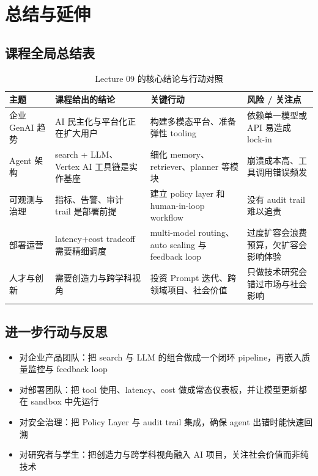 \documentclass[a4paper]{article}
\begin{document}
\section{总结与延伸}

\subsection{课程全局总结表}

\begin{table}[H]
\centering
\begin{tabular}{p{} p{} p{} p{}}
\toprule
主题 & 课程给出的结论 & 关键行动 & 风险 / 关注点 \\
\midrule
企业 GenAI 趋势 & AI 民主化与平台化正在扩大用户 & 构建多模态平台、准备弹性 tooling & 依赖单一模型或 API 易造成 lock-in \\
Agent 架构 & search + LLM、Vertex AI 工具链是实作基座 & 细化 memory、retriever、planner 等模块 & 崩溃成本高、工具调用错误频发 \\
可观测与治理 & 指标、告警、审计 trail 是部署前提 & 建立 policy layer 和 human-in-loop workflow & 没有 audit trail 难以追责 \\
部署运营 & latency+cost tradeoff 需要精细调度 & multi-model routing、auto scaling 与 feedback loop & 过度扩容会浪费预算，欠扩容会影响体验 \\
人才与创新 & 需要创造力与跨学科视角 & 投资 Prompt 迭代、跨领域项目、社会价值 & 只做技术研究会错过市场与社会影响 \\
\bottomrule
\end{tabular}
\caption{Lecture 09 的核心结论与行动对照}
\end{table}

\subsection{进一步行动与反思}

\begin{itemize}
    \item 对企业产品团队：把 search 与 LLM 的组合做成一个闭环 pipeline，再嵌入质量监控与 feedback loop
    \item 对部署团队：把 tool 使用、latency、cost 做成常态仪表板，并让模型更新都在 sandbox 中先运行
    \item 对安全治理：把 Policy Layer 与 audit trail 集成，确保 agent 出错时能快速回溯
    \item 对研究者与学生：把创造力与跨学科视角融入 AI 项目，关注社会价值而非纯技术
\end{itemize}
\end{document}
